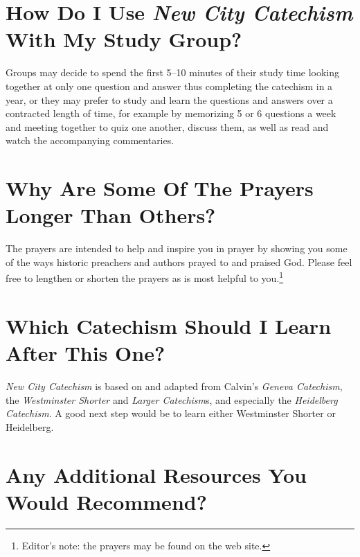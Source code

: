 \documentclass[00-main.tex]{subfiles}
\begin{document}
\section[How Do I Use {\em New City Catechism}\/ With My Study Group?][Catechism With Study Group]{How Do I Use {\em New City Catechism}\/ With My Study Group?}

Groups may decide to spend the first 5--10 minutes of their study time looking together at only one question and answer thus completing the catechism in a year, or they may prefer to study and learn the questions and answers over a contracted length of time, for example by memorizing 5 or 6 questions a week and meeting together to quiz one another, discuss them, as well as read and watch the accompanying commentaries.

\section[Why Are Some Of The Prayers Longer Than Others?][Why Are Some Prayers Longer?]{Why Are Some Of The Prayers Longer Than Others?}

The prayers are intended to help and inspire you in prayer by showing you some of the ways historic preachers and authors prayed to and praised God. Please feel free to lengthen or shorten the prayers as is most helpful to you.\footnote{Editor's note: the prayers may be found on the web site.}

\section[Which Catechism Should I Learn After This One?][Next Catechism?]{Which Catechism Should I Learn After This One?}

\emph{New City Catechism}\/ is based on and adapted from Calvin's {\em Geneva Catechism}, the {\em Westminster Shorter}\/ and {\em Larger Catechism}s, and especially the {\em Heidelberg Catechism}. A good next step would be to learn either Westminster Shorter or Heidelberg.

\section[Any Additional Resources You Would Recommend?][Additional Resources?]{Any Additional Resources You Would Recommend?}
\end{document}
